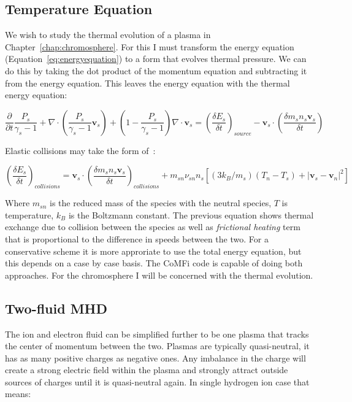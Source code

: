 \documentclass[12pt,upcase]{umlthesis}
\begin{document}
\subsection{Temperature Equation}

We wish to study the thermal evolution of a plasma in Chapter~\ref{chap:chromosphere}. For this I must transform the energy equation (Equation~\ref{eq:energyequation}) to a form that evolves thermal pressure. We can do this by taking the dot product of the momentum equation and subtracting it from the energy equation. This leaves the energy equation with the thermal energy equation:

\begin{equation}\label{eq:pressureequation}
	\frac{\partial }{\partial t}\frac{P_s}{\gamma_s - 1} +\nabla\cdot(\frac{P_s}{\gamma_s -1}\textbf{v}_s) + (1 - \frac{P_s}{\gamma_s - 1}) \nabla\cdot\textbf{v}_s = {(\frac{\delta E_s}{\delta t})}_{source} - \textbf{v}_s \cdot(\frac{\delta m_s n_s\textbf{v}_s}{\delta t})
\end{equation}

Elastic collisions may take the form of~\citep{Banks1973}:

\begin{equation}\label{eq:energycollisions}
	{(\frac{\delta E_s}{\delta t})}_{collisions} = \textbf{v}_s \cdot {(\frac{\delta m_s n_s \textbf{v}_s}{\delta t})}_{collisions} + m_{sn} \nu_{sn} n_s [ (3 k_B / m_s) (T_n - T_s) + \lvert \textbf{v}_s - \textbf{v}_n \rvert^2 ]
\end{equation}

Where $m_{sn}$ is the reduced mass of the species with the neutral species, $T$ is temperature, $k_B$ is the Boltzmann constant. The previous equation shows thermal exchange due to collision between the species as well as {\it frictional heating\/} term that is proportional to the difference in speeds between the two. For a conservative scheme it is more approriate to use the total energy equation, but this depends on a case by case basis. The CoMFi code is capable of doing both approaches. For the chromosphere I will be concerned with the thermal evolution.

\subsection{Two-fluid MHD}\label{sec:2fluidmhd}

The ion and electron fluid can be simplified further to be one plasma that tracks the center of momentum between the two. Plasmas are typically quasi-neutral, it has as many positive charges as negative ones. Any imbalance in the charge will create a strong electric field within the plasma and strongly attract outside sources of charges until it is quasi-neutral again. In single hydrogen ion case that means:
\end{document}
